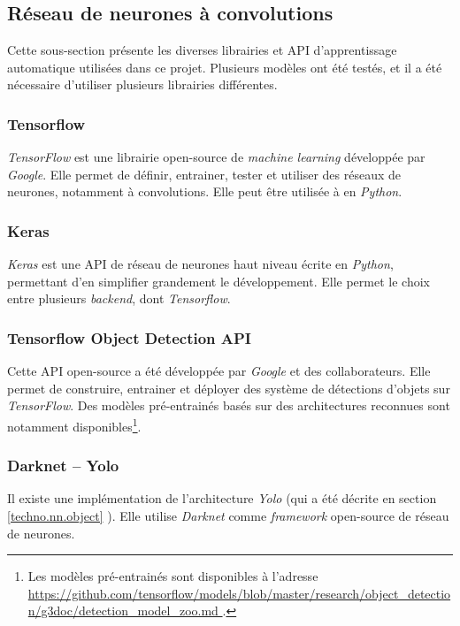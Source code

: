 \subsection{Réseau de neurones à convolutions}
Cette sous-section présente les diverses librairies et API d'apprentissage automatique utilisées dans ce projet. Plusieurs modèles ont été testés, et il a été nécessaire d'utiliser plusieurs librairies différentes. 

\subsubsection{Tensorflow}
\textit{TensorFlow}\autocite{lib:tensorflow} est une librairie open-source de \textit{machine learning} développée par \textit{Google}. Elle permet de définir, entrainer, tester et utiliser des réseaux de neurones, notamment à convolutions. Elle peut être utilisée à en \textit{Python}.\autocite{wiki:tensorflow}

\subsubsection{Keras}
\textit{Keras} est une API de réseau de neurones haut niveau écrite en \textit{Python}, permettant d'en simplifier grandement le développement. Elle permet le choix entre plusieurs \textit{backend}, dont \textit{Tensorflow}. \autocite{lib:keras}

\subsubsection{Tensorflow Object Detection API}
Cette API open-source a été développée par \textit{Google} et des collaborateurs. Elle permet de construire, entrainer et déployer des système de détections d'objets sur \textit{TensorFlow}\autocite{lib:tensorflow_object}. Des modèles pré-entrainés basés sur des architectures reconnues sont notamment disponibles\footnote{Les modèles pré-entrainés sont disponibles à l'adresse \url{https://github.com/tensorflow/models/blob/master/research/object_detection/g3doc/detection_model_zoo.md
}.}.

\subsubsection{Darknet -- Yolo}
Il existe une implémentation de l'architecture \textit{Yolo} (qui a été décrite en section \ref{techno.nn.object} ). Elle utilise \textit{Darknet} comme \textit{framework} open-source de réseau de neurones. \autocite{lib:yolo}


